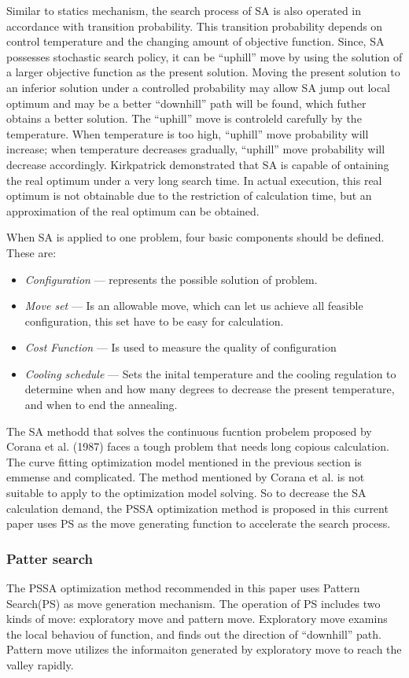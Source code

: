 \documentclass[pdftex,11pt]{article}
\begin{document}
Similar to statics mechanism, the search process of SA is also operated in accordance with transition probability. This transition probability depends on control temperature and the changing amount of objective function. Since, SA possesses stochastic search policy, it can be ``uphill'' move by using the solution of a larger objective function as the present solution. Moving the present solution to an inferior solution under a controlled probability may allow SA jump out local optimum and may be a better ``downhill'' path will be found, which futher obtains a better solution. The ``uphill'' move is controleld carefully by the temperature. When temperature is too high, ``uphill'' move probability will increase; when temperature decreases gradually, ``uphill'' move probability will decrease accordingly. Kirkpatrick demonstrated that SA is capable of ontaining the real optimum under a very long search time. In actual execution, this real optimum is not obtainable due to the restriction of calculation time, but an approximation of the real optimum can be obtained.

When SA is applied to one problem, four basic components should be defined. These are:
\begin{itemize}
\item \emph{Configuration} --- represents the possible solution of problem.
\item \emph{Move set} --- Is an allowable move, which can let us achieve all feasible configuration, this set have to be easy for calculation.
\item \emph{Cost Function} --- Is used to measure the quality of configuration
\item \emph{Cooling schedule} --- Sets the inital temperature and the cooling regulation to determine when and how many degrees to decrease the present temperature, and when to end the annealing.
\end{itemize}
The SA methodd that solves the continuous fucntion probelem proposed by Corana et al. (1987) faces a tough problem that needs long copious calculation. The curve fitting optimization model mentioned in the previous section is emmense and complicated. The method mentioned by Corana et al. is not suitable to apply to the optimization model solving. So to decrease the SA calculation demand, the PSSA optimization method is proposed in this current paper uses PS as the move generating function to accelerate the search process.

\subsubsection{Patter search}
The PSSA optimization method recommended in this paper uses Pattern Search(PS) as move generation mechanism. The operation of PS includes two kinds of move: exploratory move and pattern move. Exploratory move examins the local behaviou of function, and finds out the direction of ``downhill'' path. Pattern move utilizes the informaiton generated by exploratory move to reach the valley rapidly.
\end{document}
